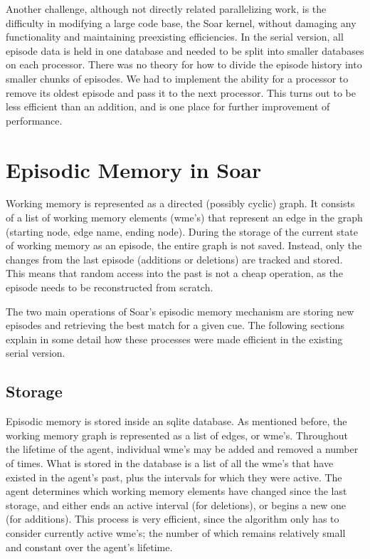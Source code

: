 \documentclass[11pt]{article} %
\begin{document}
Another challenge, although not directly related parallelizing work, is the difficulty in 
modifying a large code base, the Soar kernel, without damaging any 
functionality and maintaining preexisting efficiencies.  In the serial version,
 all episode data is held in one database and needed to be split into 
smaller databases on each processor.  There was no theory for how to divide
the episode history into smaller chunks of episodes. We had to implement the ability
for a processor to remove its oldest episode and pass it to the next processor. 
This turns out to be less efficient than an addition, and is one place for further improvement
of performance.

\section{Episodic Memory in Soar}
Working memory is represented as a directed (possibly cyclic) graph. It consists
of a list of working memory elements (wme’s) that represent an edge in the graph
(starting node, edge name, ending node). During the storage of the current state
of working memory as an episode, the entire graph is not saved. Instead, only
the changes from the last episode (additions or deletions) are tracked and
stored. This means that random access into the past is not a cheap operation, as
the episode needs to be reconstructed from scratch.

The two main operations of Soar’s episodic memory mechanism are storing new
episodes and retrieving the best match for a given cue. The following sections
explain in some detail how these processes were made efficient in the existing
serial version.

\subsection{Storage}
Episodic memory is stored inside an sqlite database. As mentioned before, the
working memory graph is represented as a list of edges, or wme’s. Throughout the
lifetime of the agent, individual wme’s may be added and removed a number of
times. What is stored in the database is a list of all the wme’s that have
existed in the agent’s past, plus the intervals for which they were active. The
agent determines which working memory elements have changed since the last
storage, and either ends an active interval (for deletions), or begins a new one
(for additions). This process is very efficient, since the algorithm only has to
consider currently active wme’s; the number of which remains relatively small
and constant over the agent’s lifetime.
\end{document}
